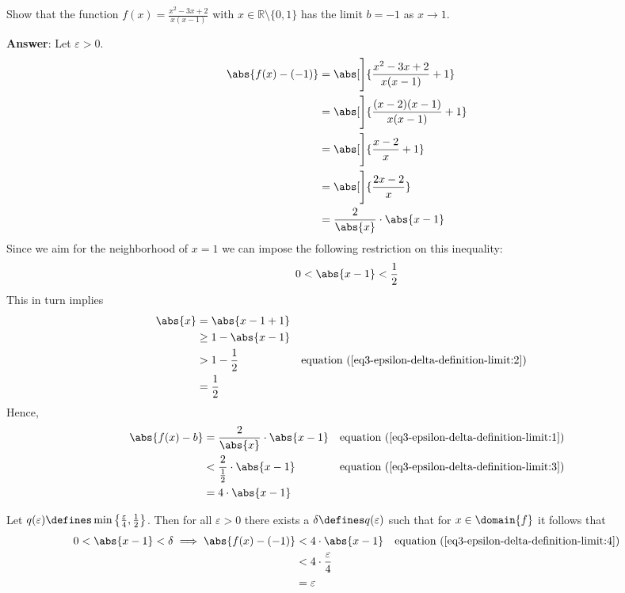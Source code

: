 \begin{exm}\label{exm-epsilon-delta-definition-limit:3}
    Show \cite[p.69]{wuest2009} that the function $f(x)=\tfrac{x^2-3x+2}{x(x-1)}$
    with $x\in\mathbb{R}\setminus\{0,1\}$ has the limit $b=-1$ as $x\to1$.
    \begin{flushleft}
        \textbf{Answer}: Let $\varepsilon>0$.
        \begin{align}
            \abs{f(x)-(-1)}&=\abs[\Bigg]{\frac{x^2-3x+2}{x(x-1)}+1}\nonumber\\
                           &=\abs[\Bigg]{\frac{(x-2)(x-1)}{x(x-1)}+1}\nonumber\\
                           &=\abs[\Bigg]{\frac{x-2}{x}+1}\nonumber\\
                           &=\abs[\Bigg]{\frac{2x-2}{x}}\nonumber\\
                           &=\frac{2}{\abs{x}}\cdot\abs{x-1}\label{eq3-epsilon-delta-definition-limit:1}
        \end{align}
        Since we aim for the neighborhood of $x=1$ we can impose the following
        restriction on this inequality:
        \begin{equation}\label{eq3-epsilon-delta-definition-limit:2}
            0<\abs{x-1}<\frac{1}{2}
        \end{equation}
        This in turn implies
        \begin{align}
            \abs{x}&=\abs{x-1+1}\nonumber\\
                   &\geq1-\abs{x-1}\nonumber\\
                   &>1-\frac{1}{2} && \text{\pref{equation}{eq3-epsilon-delta-definition-limit:2}}\nonumber\\
                   &=\frac{1}{2}\label{eq3-epsilon-delta-definition-limit:3}
        \end{align}
        Hence,
        \begin{align}
            \abs{f(x)-b}&=\frac{2}{\abs{x}}\cdot\abs{x-1} && \text{\pref{equation}{eq3-epsilon-delta-definition-limit:1}}\nonumber\\
                        &<\frac{2}{\tfrac{1}{2}}\cdot\abs{x-1} && \text{\pref{equation}{eq3-epsilon-delta-definition-limit:3}}\nonumber\\
                        &=4\cdot\abs{x-1}\label{eq3-epsilon-delta-definition-limit:4}
        \end{align}
    \end{flushleft}
    Let $q(\varepsilon)\defines\min\left\{\tfrac{\varepsilon}{4},\tfrac{1}{2}\right\}$.
    Then for all $\varepsilon>0$ there exists a $\delta\defines q(\varepsilon)$ such that
    for $x\in\domain{f}$ it follows that
    \begin{align*}
        0<\abs{x-1}<\delta \implies \abs{f(x)-(-1)}&<4\cdot\abs{x-1}&&\text{\pref{equation}{eq3-epsilon-delta-definition-limit:4}}\\
                                                   &<4\cdot\frac{\varepsilon}{4}\\
                                                   &=\varepsilon
    \end{align*}
\end{exm}

